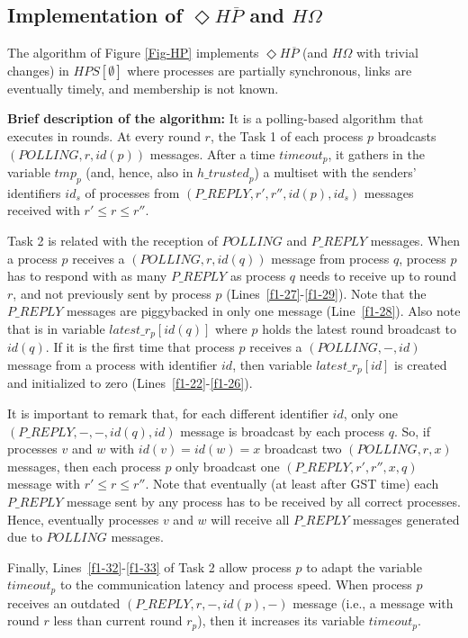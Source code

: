\documentclass[10pt, conference, compsocconf]{IEEEtran}
\newcommand{\tightparagraph}[1]{\smallskip \noindent \textbf{#1} \hspace{1ex}}
\newcommand{\HO}{{H\Omega}}
\newcommand{\HP}{{ \Diamond H\overline{P}}}
\newcommand{\trusted}{{\mathit{h\_trusted}}}
\begin{document}
\subsection{Implementation of $\HP$ and $\HO$}
The algorithm of Figure \ref{Fig-HP} implements ${\HP}$ (and ${\HO}$ 
with trivial changes) in $\mathit{HPS}[\emptyset]$ where processes 
are partially synchronous, links are eventually timely, and membership 
is not known. 

\tightparagraph{Brief description of the algorithm:} 
It is a polling-based algorithm that executes in rounds. 
At every round $r$, the Task 1 of each process $p$ broadcasts 
$(POLLING,r,id(p))$ messages. After a time $timeout_p$, 
it gathers in the variable $tmp_p$ (and, hence, also in $\trusted_p$) 
a multiset with the senders' identifiers $id_s$ of processes from 
$(P\_REPLY,r',r'',id(p),id_s)$ messages received with $r' \le r \le r''$.

Task 2 is related with the reception of $POLLING$ and $P\_REPLY$ 
messages. When a process $p$ receives a $(POLLING,r,id(q))$ message from 
process $q$, process $p$ has to respond with as many $P\_REPLY$ 
as process $q$ needs to receive up to round $r$, and not 
previously sent by process $p$ (Lines~\ref{f1-27}-\ref{f1-29}). 
Note that the $P\_REPLY$ 
messages are piggybacked in only one message (Line~\ref{f1-28}). 
Also note that is in variable $latest\_r_p[id(q)]$ where $p$ holds the 
latest round broadcast to $id(q)$. 
If it is the first time that process $p$ receives a $(POLLING,-,id)$ 
message from a process with identifier 
$id$, then variable $latest\_r_p[id]$ is created and initialized to 
zero (Lines~\ref{f1-22}-\ref{f1-26}).

It is important to remark that, for each different identifier $id$, 
only one $(P\_REPLY,-,-,id(q),id)$ 
message is broadcast by each process $q$. So, if processes $v$ and 
$w$ with $id(v)=id(w)=x$ broadcast two $(POLLING,r,x)$ messages, 
then each process $p$ only broadcast one $(P\_REPLY,r',r'',x,q)$ 
message with  $r' \le r \le r''$. Note that eventually (at least after 
GST time) each $P\_REPLY$  
message sent by any process has to be received by all correct processes. 
Hence, eventually processes $v$ and $w$ 
will receive all $P\_REPLY$  messages generated due to $POLLING$ messages.

Finally, Lines~\ref{f1-32}-\ref{f1-33} of Task 2 allow process $p$ 
to adapt the variable 
$timeout_p$ to the communication latency and process speed. 
When process $p$ receives an outdated $(P\_REPLY,r,-,id(p),-)$ 
message (i.e., a message with round $r$ less than current round $r_p$), 
then it increases its variable $timeout_p$.
\end{document}
